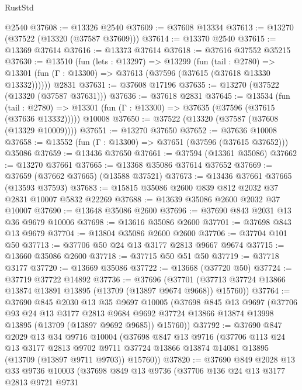 \begin{lexlean}{RustStd}
\begin{coremodule}
    @2540
@37608 := @13326 @2540
@37609 := @37608 @13334
@37613 := @13270 (@37522 (@13320 (@37587 @37609)))
@37614 := @13370 @2540
@37615 := @13369 @37614
@37616 := @13373 @37614
@37618 := @37616 @37552 @35215
@37630 := @13510
    (fun (lets : @13297) =>
    @13299
      (fun (tail : @2780) =>
      @13301 (fun (Γ : @13300) => @37613 (@37596 (@37615 (@37618 @13330 @13332))))))
    @2831
@37631 := @37608 @17196
@37635 := @13270 (@37522 (@13320 (@37587 @37631)))
@37636 := @37618 @2831
@37645 := @13534
    (fun (tail : @2780) => @13301 (fun (Γ : @13300) => @37635 (@37596 (@37615 (@37636 @13332)))))
    @10008
@37650 := @37522 (@13320 (@37587 (@37608 (@13329 @10009))))
@37651 := @13270 @37650
@37652 := @37636 @10008
@37658 := @13552 (fun (Γ : @13300) => @37651 (@37596 (@37615 @37652))) @35086
@37659 := @13436 @37650
@37661 := @37594 (@13361 @35086)
@37662 := @13270 @37661
@37665 := @13368 @35086 @37614 @37652
@37669 := @37659 (@37662 @37665) (@13588 @37521)
@37673 := @13436 @37661 @37665 (@13593 @37593)
@37683 := @15815 @35086 @2600 @839 @812 @2032 @37 @2831 @10007 @5832 @22269
@37688 := @13639 @35086 @2600 @2032 @37 @10007
@37690 := @13648 @35086 @2600
@37696 := @37690 @843 @2031 @13 @36 @9679 @10006
@37698 := @13616 @35086 @2600
@37701 := @37698 @843 @13 @9679
@37704 := @13804 @35086 @2600 @2600
@37706 := @37704 @101 @50
@37713 := @37706 @50 @24 @13 @3177 @2813 @9667 @9674
@37715 := @13660 @35086 @2600
@37718 := @37715 @50 @51 @50
@37719 := @37718 @3177
@37720 := @13669 @35086
@37722 := @13668 (@37720 @50)
@37724 := @37719 @37722 @14892
@37736 := @37696
    (@37701 (@37713 @37724 @13866 @13874 @13891 @13895 (@13709 (@13897 @9674 @9668)) @15760))
@37764 := @37690
    @845
    @2030
    @13
    @35
    @9697
    @10005
    (@37698
      @845
      @13
      @9697
      (@37706
        @93
        @24
        @13
        @3177
        @2813
        @9684
        @9692
        @37724
        @13866
        @13874
        @13998
        @13895
        (@13709 (@13897 @9692 @9685))
        @15760))
@37792 := @37690
    @847
    @2029
    @13
    @34
    @9716
    @10004
    (@37698
      @847
      @13
      @9716
      (@37706
        @113
        @24
        @13
        @3177
        @2813
        @9702
        @9711
        @37724
        @13866
        @13874
        @14081
        @13895
        (@13709 (@13897 @9711 @9703))
        @15760))
@37820 := @37690
    @849
    @2028
    @13
    @33
    @9736
    @10003
    (@37698
      @849
      @13
      @9736
      (@37706
        @136
        @24
        @13
        @3177
        @2813
        @9721
        @9731

\end{coremodule}
\end{lexlean}
